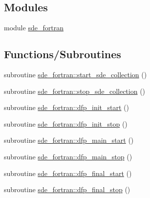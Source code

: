 \subsection*{Modules}
\begin{DoxyCompactItemize}
\item 
module \hyperlink{namespacesde__fortran}{sde\+\_\+fortran}
\end{DoxyCompactItemize}
\subsection*{Functions/\+Subroutines}
\begin{DoxyCompactItemize}
\item 
subroutine \hyperlink{namespacesde__fortran_a9dcafc1808f598ebbe966662c18e695f}{sde\+\_\+fortran\+::start\+\_\+sde\+\_\+collection} ()
\item 
subroutine \hyperlink{namespacesde__fortran_aeec75792bfd6bce8fe6c06b6066c626b}{sde\+\_\+fortran\+::stop\+\_\+sde\+\_\+collection} ()
\item 
subroutine \hyperlink{namespacesde__fortran_a19d5887d0640c32970310bf58e5e5fd3}{sde\+\_\+fortran\+::dfp\+\_\+init\+\_\+start} ()
\item 
subroutine \hyperlink{namespacesde__fortran_a8b044c69f0582c3001cbf91dd6d768ab}{sde\+\_\+fortran\+::dfp\+\_\+init\+\_\+stop} ()
\item 
subroutine \hyperlink{namespacesde__fortran_a1eb8eda9071725bc839e09df6ab64f91}{sde\+\_\+fortran\+::dfp\+\_\+main\+\_\+start} ()
\item 
subroutine \hyperlink{namespacesde__fortran_a06cb12710fb767b9e600125c1a27b419}{sde\+\_\+fortran\+::dfp\+\_\+main\+\_\+stop} ()
\item 
subroutine \hyperlink{namespacesde__fortran_a43ddcf08d3733a6fed5b73ce8dbadc18}{sde\+\_\+fortran\+::dfp\+\_\+final\+\_\+start} ()
\item 
subroutine \hyperlink{namespacesde__fortran_a7840468806772493742de4ab645116ee}{sde\+\_\+fortran\+::dfp\+\_\+final\+\_\+stop} ()
\end{DoxyCompactItemize}
